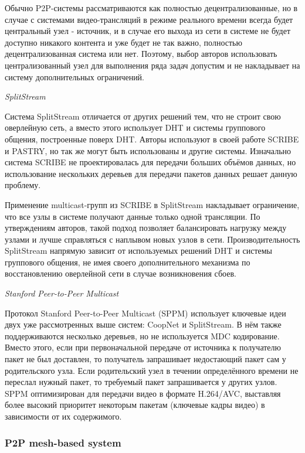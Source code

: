 		Обычно P2P-системы рассматриваются как полностью децентрализованные, но в случае с системами видео-трансляций в
		режиме реального времени всегда будет центральный узел - источник, и в случае его выхода из сети в системе не
		будет доступно никакого контента и уже будет не так важно, полностью децентрализованная система или нет.
		Поэтому, выбор авторов использовать централизованный узел для выполнения ряда задач допустим и не накладывает на
		систему дополнительных ограничений.

		\textit{SplitStream}

		Система SplitStream отличается от других решений тем, что не строит свою оверлейную сеть, а вместо этого
		использует DHT и системы группового общения, построенные поверх DHT. Авторы используют в своей работе SCRIBE и
		PASTRY, но так же могут быть использованы и другие системы. Изначально система SCRIBE не проектировалась для
		передачи больших объёмов данных, но использование нескольких деревьев для передачи пакетов данных решает данную
		проблему.

		Применение multicast-групп из SCRIBE в SplitStream накладывает ограничение, что все узлы в системе получают
		данные только одной трансляции. По утверждениям авторов, такой подход позволяет балансировать нагрузку между
		узлами и лучше справляться с наплывом новых узлов в сети. Производительность SplitStream напрямую зависит от
		используемых решений DHT и системы группового общения, не имея своего дополнительного механизма по
		восстановлению оверлейной сети в случае возникновения сбоев.

		\textit{Stanford Peer-to-Peer Multicast}

		Протокол Stanford Peer-to-Peer Multicast (SPPM) использует ключевые идеи двух уже рассмотренных выше систем:
		CoopNet и SplitStream. В нём также поддерживаются несколько деревьев, но не используется MDC кодирование.
		Вместо этого, если при первоначальной передаче от источника к получателю пакет не был доставлен, то получатель
		запрашивает недостающий пакет сам у родительского узла. Если родительский узел в течении определённого времени
		не переслал нужный пакет, то требуемый пакет запрашивается у других узлов. SPPM оптимизирован для передачи
		видео в формате H.264/AVC, выставляя более высокий приоритет некоторым пакетам (ключевые кадры видео) в
		зависимости от их содержимого.

		\subsubsection{P2P mesh-based system}

